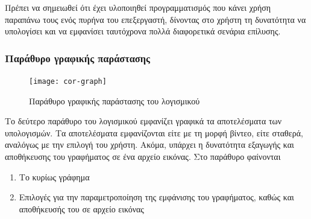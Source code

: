 Πρέπει να σημειωθεί ότι έχει υλοποιηθεί προγραμματισμός που κάνει χρήση παραπάνω τους ενός πυρήνα του επεξεργαστή, δίνοντας στο χρήστη τη δυνατότητα να υπολογίσει και να εμφανίσει ταυτόχρονα πολλά διαφορετικά σενάρια επίλυσης.

\subsubsection{Παράθυρο γραφικής παράστασης}
\begin{figure}
\label{fig:cor-graph}
\centering
\texttt{[image: cor-graph]}
\caption{Παράθυρο γραφικής παράστασης του λογισμικού }
\end{figure}
Το δεύτερο παράθυρο του λογισμικού εμφανίζει γραφικά τα αποτελέσματα των υπολογισμών. Τα αποτελέσματα εμφανίζονται είτε με τη μορφή βίντεο, είτε σταθερά, αναλόγως με την επιλογή του χρήστη. Ακόμα, υπάρχει η δυνατότητα εξαγωγής και αποθήκευσης του γραφήματος σε ένα αρχείο εικόνας. Στο παράθυρο φαίνονται
\begin{enumerate}
\item Το κυρίως γράφημα
\item Επιλογές για την παραμετροποίηση της εμφάνισης του γραφήματος, καθώς και αποθήκευσής του σε αρχείο εικόνας
\end{enumerate}


